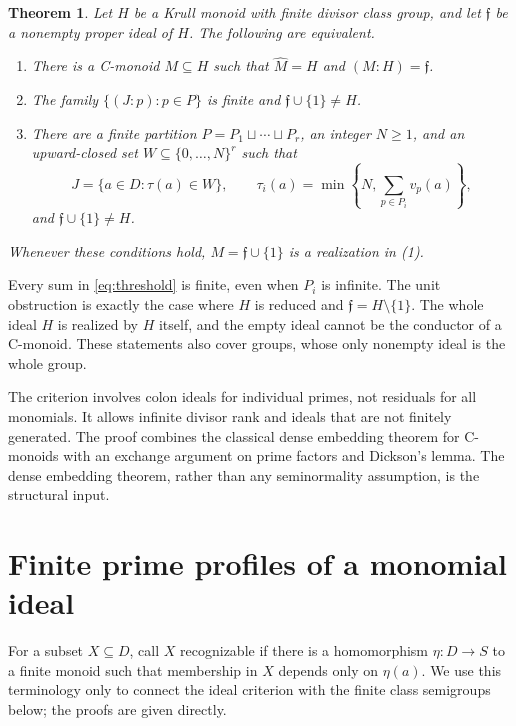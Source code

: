 \documentclass[11pt]{article}
\newtheorem{theorem}{Theorem}[section]
\theoremstyle{definition}
\newcommand{\ff}{\mathfrak f}
\begin{document}
\newpage
\begin{theorem}\label{thm:main}
Let $H$ be a Krull monoid with finite divisor class group, and let $\ff$ be a nonempty proper ideal of $H$. The following are equivalent.
\begin{enumerate}
\item There is a C-monoid $M\subseteq H$ such that $\widehat M=H$ and $(M:H)=\ff$.
\item The family $\{(J:p):p\in P\}$ is finite and $\ff\cup\{1\}\ne H$.
\item There are a finite partition $P=P_1\sqcup\cdots\sqcup P_r$, an integer $N\ge1$, and an upward-closed set $W\subseteq\{0,\ldots,N\}^r$ such that
\begin{equation}\label{eq:threshold}
 J=\{a\in D:\tau(a)\in W\},\qquad
 \tau_i(a)=\min\left\{N,\sum_{p\in P_i}v_p(a)\right\},
\end{equation}
and $\ff\cup\{1\}\ne H$.
\end{enumerate}
Whenever these conditions hold, $M=\ff\cup\{1\}$ is a realization in (1).
\end{theorem}

Every sum in \eqref{eq:threshold} is finite, even when $P_i$ is infinite. The unit obstruction is exactly the case where $H$ is reduced and $\ff=H\setminus\{1\}$. The whole ideal $H$ is realized by $H$ itself, and the empty ideal cannot be the conductor of a C-monoid. These statements also cover groups, whose only nonempty ideal is the whole group.

The criterion involves colon ideals for individual primes, not residuals for all monomials. It allows infinite divisor rank and ideals that are not finitely generated. The proof combines the classical dense embedding theorem for C-monoids with an exchange argument on prime factors and Dickson's lemma. The dense embedding theorem, rather than any seminormality assumption, is the structural input.

\section{Finite prime profiles of a monomial ideal}

For a subset $X\subseteq D$, call $X$ recognizable if there is a homomorphism $\eta:D\to S$ to a finite monoid such that membership in $X$ depends only on $\eta(a)$. We use this terminology only to connect the ideal criterion with the finite class semigroups below; the proofs are given directly.
\end{document}
